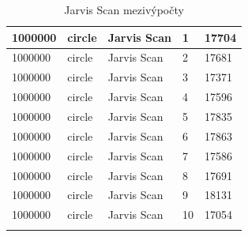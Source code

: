\documentclass[12pt]{article}
\begin{document}
\begin{longtable}{|l|l|l|l|l|}
1000000      & circle            & Jarvis Scan & 1          & 17704                         \\ \hline
1000000      & circle            & Jarvis Scan & 2          & 17681                         \\ \hline
1000000      & circle            & Jarvis Scan & 3          & 17371                         \\ \hline
1000000      & circle            & Jarvis Scan & 4          & 17596                         \\ \hline
1000000      & circle            & Jarvis Scan & 5          & 17835                         \\ \hline
1000000      & circle            & Jarvis Scan & 6          & 17863                         \\ \hline
1000000      & circle            & Jarvis Scan & 7          & 17586                         \\ \hline
1000000      & circle            & Jarvis Scan & 8          & 17691                         \\ \hline
1000000      & circle            & Jarvis Scan & 9          & 18131                         \\ \hline
1000000      & circle            & Jarvis Scan & 10         & 17054                         \\ \hline
\caption{Jarvis Scan mezivýpočty}
\end{longtable}
\end{document}
